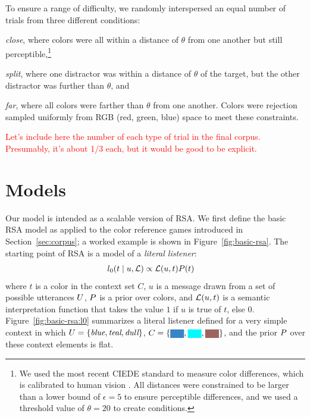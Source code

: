 \documentclass[11pt,letterpaper]{article}
\newcommand{\term}{\textit}
\newcommand{\word}{\textit}
\newcommand{\utt}{u}
\newcommand{\context}{C}
\newcommand{\target}{t}
\renewcommand{\|}{\mid}
\newcommand{\set}[1]{\left\{#1\right\}}
\newcommand{\secref}[1]{Section~\ref{#1}}
\newcommand{\Figref}[1]{Figure~\ref{#1}}
\newcommand{\figref}[1]{Figure~\ref{#1}}
\newcommand{\colorPatch}[2][xxxx]{
  \colorbox[HTML]{#2}{{\color[HTML]{#2}#1}}}
\newcommand{\colorContextNarrow}[3]{
  \colorPatch[xx]{#1}, \colorPatch[xx]{#2}, \colorPatch[xx]{#3}}
\newcommand{\todocheck}[1]{\textcolor{red}{#1}}
\newcommand{\cond}{\emph}
\begin{document}
To ensure a range of difficulty, we randomly interspersed an equal
number of trials from three different conditions:
%
\begin{enumerate*}[label=(\arabic*)]%
\item \cond{close}, where colors were all within a distance of
  $\theta$ from one another but still perceptible,\footnote{We used the
    most recent CIEDE standard to measure color differences, which is
    calibrated to human vision \cite{SharmaWuDalal05_DeltaE}. All
    distances were constrained to be larger than a lower bound of
    $\epsilon = 5$ to ensure perceptible differences, and we used a
    threshold value of $\theta = 20$ to create conditions.} 
\item \cond{split}, where one distractor was within a distance of
  $\theta$ of the target, but the other distractor was further than
  $\theta$, and
\item \cond{far}, where all colors were farther than $\theta$ from one
  another. Colors were rejection sampled uniformly from RGB (red,
  green, blue) space to meet these constraints.
\end{enumerate*}
\todocheck{Let's include here the number of each type of trial in the
final corpus. Presumably, it's about 1/3 each, but it would be good
to be explicit.}


\section{Models}

Our model is intended as a scalable version of RSA. We first define the
basic RSA model as applied to the
color reference games introduced in \secref{sec:corpus}; a worked example
is shown in \figref{fig:basic-rsa}. The starting point of RSA is a model
of a \term{literal listener}:
\begin{align}
  l_{0}(\target \| \utt, \Lex)
  &\propto
  \Lex(\utt, \target) \targetPrior(\target)
\end{align}
where $\target$ is a color in the context
set $\context$, $\utt$ is a message drawn from a set of possible
utterances $U$, $P$ is a prior over colors,
and $\Lex(\utt, \target)$ is a semantic interpretation function that
takes the value $1$ if $\utt$ is true of $\target$, else $0$.
\Figref{fig:basic-rsa:l0} summarizes a literal listener defined for 
a very simple context in which $\Messages=\set{\word{blue},
  \word{teal}, \word{dull}}$, $\context =
\set{\colorContextNarrow{3884C7}{02F9FD}{9E6461}{}}$, 
and the prior $P$ over these context elements is flat.
\end{document}
